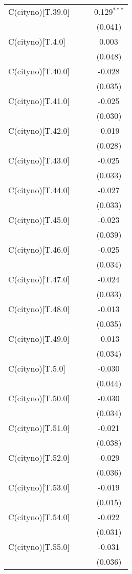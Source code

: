 \begin{table}[!htbp]
\begin{tabular}{@{\extracolsep{5pt}}lccc}
 C(cityno)[T.39.0] & & & 0.129$^{***}$ \\
& & & (0.041) \\
 C(cityno)[T.4.0] & & & 0.003$^{}$ \\
& & & (0.048) \\
 C(cityno)[T.40.0] & & & -0.028$^{}$ \\
& & & (0.035) \\
 C(cityno)[T.41.0] & & & -0.025$^{}$ \\
& & & (0.030) \\
 C(cityno)[T.42.0] & & & -0.019$^{}$ \\
& & & (0.028) \\
 C(cityno)[T.43.0] & & & -0.025$^{}$ \\
& & & (0.033) \\
 C(cityno)[T.44.0] & & & -0.027$^{}$ \\
& & & (0.033) \\
 C(cityno)[T.45.0] & & & -0.023$^{}$ \\
& & & (0.039) \\
 C(cityno)[T.46.0] & & & -0.025$^{}$ \\
& & & (0.034) \\
 C(cityno)[T.47.0] & & & -0.024$^{}$ \\
& & & (0.033) \\
 C(cityno)[T.48.0] & & & -0.013$^{}$ \\
& & & (0.035) \\
 C(cityno)[T.49.0] & & & -0.013$^{}$ \\
& & & (0.034) \\
 C(cityno)[T.5.0] & & & -0.030$^{}$ \\
& & & (0.044) \\
 C(cityno)[T.50.0] & & & -0.030$^{}$ \\
& & & (0.034) \\
 C(cityno)[T.51.0] & & & -0.021$^{}$ \\
& & & (0.038) \\
 C(cityno)[T.52.0] & & & -0.029$^{}$ \\
& & & (0.036) \\
 C(cityno)[T.53.0] & & & -0.019$^{}$ \\
& & & (0.015) \\
 C(cityno)[T.54.0] & & & -0.022$^{}$ \\
& & & (0.031) \\
 C(cityno)[T.55.0] & & & -0.031$^{}$ \\
& & & (0.036) \\

\end{tabular}
\end{table}
